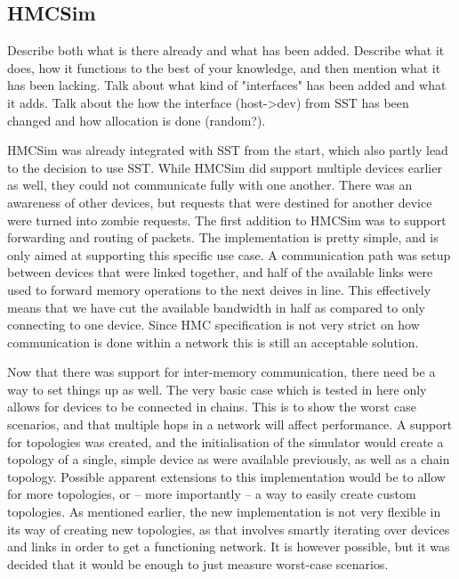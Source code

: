 

\subsection{HMCSim} \label{HMC-Sim}
Describe both what is there already and what has been added. Describe what it does, how it functions to the best of your knowledge, and then mention what it has been lacking. Talk about what kind of "interfaces" has been added and what it adds. Talk about the how the interface (host->dev) from SST has been changed and how allocation is done (random?). 

HMCSim was already integrated with SST from the start, which also partly lead to the decision to use SST. While HMCSim did support multiple devices earlier as well, they could not communicate fully with one another. There was an awareness of other devices, but requests that were destined for another device were turned into zombie requests. The first addition to HMCSim was to support forwarding and routing of packets. The implementation is pretty simple, and is only aimed at supporting this specific use case. A communication path was setup between devices that were linked together, and half of the available links were used to forward memory operations to the next deives in line. This effectively means that we have cut the available bandwidth in half as compared to only connecting to one device. Since HMC specification is not very strict on how communication is done within a network this is still an acceptable solution. 

Now that there was support for inter-memory communication, there need be a way to set things up as well. The very basic case which is tested in here only allows for devices to be connected in chains. This is to show the worst case scenarios, and that multiple hops in a network will affect performance. A support for topologies was created, and the initialisation of the simulator would create a topology of a single, simple device as were available previously, as well as a chain topology. Possible apparent extensions to this implementation would be to allow for more topologies, or -- more importantly -- a way to easily create custom topologies. As mentioned earlier, the new implementation is not very flexible in its way of creating new topologies, as that involves smartly iterating over devices and links in order to get a functioning network. It is however possible, but it was decided that it would be enough to just measure worst-case scenarios. 

